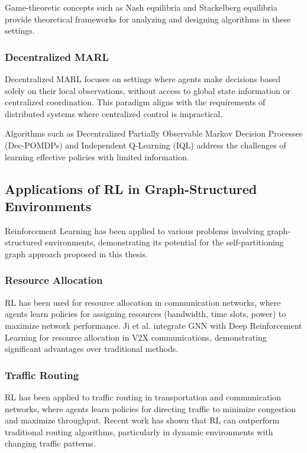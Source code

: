 \documentclass{article}
\begin{document}
Game-theoretic concepts such as Nash equilibria and Stackelberg equilibria provide theoretical frameworks for analyzing and designing algorithms in these settings.

\subsubsection{Decentralized MARL}

Decentralized MARL focuses on settings where agents make decisions based solely on their local observations, without access to global state information or centralized coordination. This paradigm aligns with the requirements of distributed systems where centralized control is impractical.

Algorithms such as Decentralized Partially Observable Markov Decision Processes (Dec-POMDPs) \cite{oliehoek2016concise} and Independent Q-Learning (IQL) \cite{tan1993multi} address the challenges of learning effective policies with limited information.

\subsection{Applications of RL in Graph-Structured Environments}

Reinforcement Learning has been applied to various problems involving graph-structured environments, demonstrating its potential for the self-partitioning graph approach proposed in this thesis.

\subsubsection{Resource Allocation}

RL has been used for resource allocation in communication networks, where agents learn policies for assigning resources (bandwidth, time slots, power) to maximize network performance. Ji et al. \cite{ji2024graph} integrate GNN with Deep Reinforcement Learning for resource allocation in V2X communications, demonstrating significant advantages over traditional methods.

\subsubsection{Traffic Routing}

RL has been applied to traffic routing in transportation and communication networks, where agents learn policies for directing traffic to minimize congestion and maximize throughput. Recent work has shown that RL can outperform traditional routing algorithms, particularly in dynamic environments with changing traffic patterns.
\end{document}
